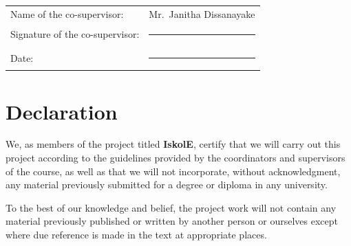 \documentclass[12pt, a4paper]{report}
\begin{document}
\noindent
\begin{tabular}{@{} p{6cm} p{8cm} @{}}
Name of the co-supervisor: & Mr.\ Janitha Dissanayake \\[1cm]
Signature of the co-supervisor: & \rule{6cm}{0.4pt} \\[1cm]
Date: & \rule{6cm}{0.4pt} \\
\end{tabular}

\chapter{Declaration}

We, as members of the project titled \textbf{IskolE}, certify that we will carry out this project according to the guidelines provided by the coordinators and supervisors of the course, as well as that we will not incorporate, without acknowledgment, any material previously submitted for a degree or diploma in any university.

To the best of our knowledge and belief, the project work will not contain any material previously published or written by another person or ourselves except where due reference is made in the text at appropriate places.

\vspace{2cm}

\begin{figure}[H]
    \centering
\end{figure}

\end{document}
